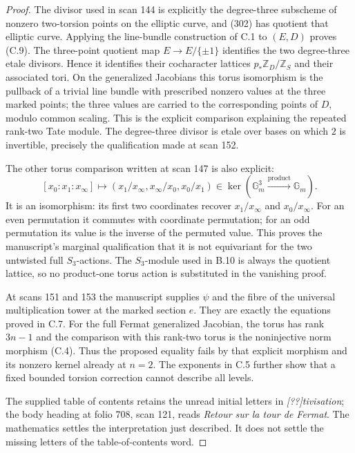 \begin{proof}
The divisor used in scan 144 is explicitly the degree-three
subscheme of nonzero two-torsion points on the elliptic curve,
and (302) has quotient that elliptic curve. Applying the
line-bundle construction of C.1 to \((E,D)\) proves (C.9).
The three-point quotient map \(E\to E/\{\pm1\}\) identifies the
two degree-three etale divisors. Hence it identifies their
cocharacter lattices \(p_*\mathbb Z_D/\mathbb Z_S\) and their
associated tori. On the generalized Jacobians this torus isomorphism
is the pullback of a trivial line bundle with prescribed nonzero
values at the three marked points; the three values are carried
to the corresponding points of \(D\), modulo common scaling.
This is the explicit comparison explaining
the repeated rank-two Tate module. The degree-three divisor
is etale over bases on which \(2\) is invertible, precisely
the qualification made at scan 152.

The other torus comparison written at scan 147 is also explicit:
\[
 [x_0:x_1:x_\infty]\longmapsto
 (x_1/x_\infty,x_\infty/x_0,x_0/x_1)
 \in\ker(\mathbb G_m^3\xrightarrow{\mathrm{product}}\mathbb G_m).
\]
It is an isomorphism: its first two coordinates recover
\(x_1/x_\infty\) and \(x_0/x_\infty\).
For an even permutation it commutes with coordinate permutation;
for an odd permutation its value is the inverse of the permuted
value. This proves the manuscript's marginal qualification that
it is not equivariant for the two untwisted full \(S_3\)-actions.
The \(S_3\)-module used in B.10 is always the quotient lattice,
so no product-one torus action is substituted in the vanishing proof.

At scans 151 and 153 the manuscript supplies \(\psi\) and the
fibre of the universal multiplication tower at the marked
section \(e\). They are exactly the equations proved in C.7.
For the full Fermat generalized Jacobian, the torus has rank
\(3n-1\) and the comparison with this rank-two torus is the
noninjective norm morphism (C.4). Thus the proposed equality
fails by that explicit morphism and its nonzero kernel already
at \(n=2\). The exponents in C.5 further show that a fixed
bounded torsion correction cannot describe all levels.

The supplied table of contents retains the unread initial
letters in \emph{[??]tivisation}; the body heading at folio 708, scan 121,
reads \emph{Retour sur la tour de Fermat}. The mathematics
settles the interpretation just described. It does not settle
the missing letters of the table-of-contents word.
\end{proof}
